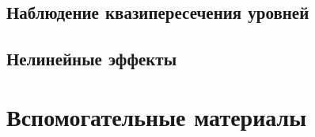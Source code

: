 \documentclass[aspectratio=169, 13pt]{beamer}
\begin{document}
\subsection{Наблюдение квазипересечения уровней}
\subsection{Нелинейные эффекты}


\appendix

\section*{Вспомогательные материалы}
\end{document}
